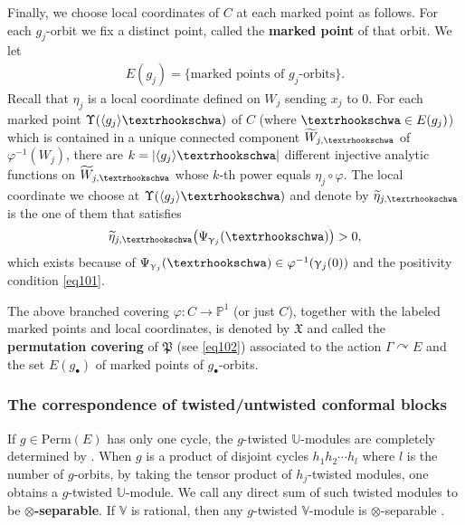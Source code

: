 \documentclass[12pt,a4paper,notitlepage]{article}
\theoremstyle{definition}
\theoremstyle{plain}
\newcommand{\fk}{\mathfrak}
\newcommand{\mc}{\mathcal}
\newcommand{\wtd}{\widetilde}
\newcommand{\bk}[1]{\langle {#1}\rangle}
\newcommand{\blt}{\bullet}
\newcommand{\Vbb}{\mathbb V}
\newcommand{\Ubb}{\mathbb U}
\newcommand{\Cbb}{\mathbb C}
\newcommand{\Pbb}{\mathbb P}
\newcommand{\Perm}{\mathrm{Perm}}
\newcommand{\tipae}{\text{\textrhookschwa}}
\numberwithin{equation}{subsection}
\begin{document}
Finally, we choose local coordinates of $C$ at each marked point as follows. For each $g_j$-orbit we fix a distinct point, called the \textbf{marked point} of that orbit. We let 
\begin{align*}
	E(g_j)=\{\text{marked points of $g_j$-orbits}\}.
\end{align*}
Recall that $\eta_j$ is a local coordinate defined on $W_j$ sending $x_j$ to $0$. For each marked point $\Upsilon(\bk{g_j}\tipae)$ of $C$ (where $\tipae\in E(g_j)$) which is contained in a unique connected component $\wtd W_{j,\tipae}$ of $\varphi^{-1}(W_j)$, there are $k=|\bk{g_j}\tipae|$ different injective analytic functions on $\wtd W_{j,\tipae}$ whose $k$-th power equals $\eta_j\circ\varphi$. The local coordinate we choose at $\Upsilon(\bk{g_j}\tipae)$ and denote by $\wtd\eta_{j,\tipae}$ is the one of them that satisfies
\begin{align*}
\wtd\eta_{j,\tipae}\big(\Psi_{\upgamma_j}(\tipae)\big)>0,	
\end{align*}
which exists because of $\Psi_{\upgamma_j}(\tipae)\in\varphi^{-1}(\upgamma_j(0))$ and the positivity condition \eqref{eq101}.

The above branched covering $\varphi:C\rightarrow\Pbb^1$ (or just $C$), together with the labeled marked points and local coordinates, is denoted by $\fk X$ and called the \textbf{permutation covering} of  $\fk P$ (see \eqref{eq102}) associated to the action $\Gamma\curvearrowright E$ and the set $E(g_\blt)$ of marked points of $g_\blt$-orbits.



\subsubsection*{The correspondence of twisted/untwisted conformal blocks}

If $g\in\Perm(E)$ has only one cycle, the $g$-twisted $\Ubb$-modules are completely determined by \cite{BDM02}. When $g$ is a product of disjoint cycles $h_1h_2\cdots h_l$ where $l$ is the number of $g$-orbits, by taking the tensor product of $h_j$-twisted modules, one obtains a $g$-twisted $\Ubb$-module. We call any direct sum of such twisted modules  to be \textbf{$\otimes$-separable}. If $\Vbb$ is rational, then any $g$-twisted $\Vbb$-module is $\otimes$-separable \cite[Thm. 6.4]{BDM02}.

\end{document}
